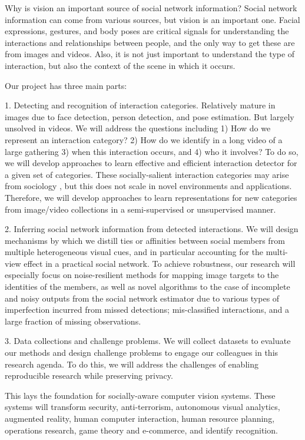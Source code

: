 Why is vision an important source of social network information? Social network information can come from various sources, but vision is an important one. Facial expressions, gestures, and body poses are critical signals for understanding the interactions and relationships between people, and the only way to get these are from images and videos. Also, it is not just important to understand the type of interaction, but also the context of the scene in which it occurs.

Our project has three main parts:

1. Detecting and recognition of interaction categories. Relatively mature in images due to face detection, person detection, and pose estimation. But largely unsolved in videos. We will address the questions including 1) How do we represent an interaction category? 2) How do we identify in a long video of a large gathering 3) when this interaction occurs, and 4) who it involves? To do so, we will develop approaches to learn effective and efficient interaction detector for  a given set of categories. These socially-salient interaction categories may arise from sociology \cite{Kendon1990,Ekman,Hoyle,Tannen,Goodwin2000,Goldin,Goodwin2007,Kendon2010,Lazer2009}, but this does not scale in novel environments and applications. Therefore, we will develop approaches to learn representations for new categories from image/video collections in a semi-supervised or unsupervised manner.

2. Inferring social network information from detected interactions. We will design mechanisms by which we distill ties or affinities between social members from multiple heterogeneous visual cues, and in particular accounting for the multi-view effect in a practical social network. To achieve robustness, our research will especially focus on noise-resilient methods for mapping image targets to the identities of the members, as well as novel algorithms to the case of incomplete and noisy outputs from the social network estimator due to various types of imperfection incurred from missed detections; mis-classified interactions, and a large fraction of missing observations.

3. Data collections and challenge problems. We will collect datasets to evaluate our methods and design challenge problems to engage our colleagues in this research agenda. To do this, we will address the challenges of enabling reproducible research while preserving privacy.

This lays the foundation for socially-aware computer vision systems. These systems will transform security, anti-terrorism, autonomous visual analytics, augmented reality, human computer interaction, human resource planning, operations research, game theory and e-commerce, and identify recognition. 

